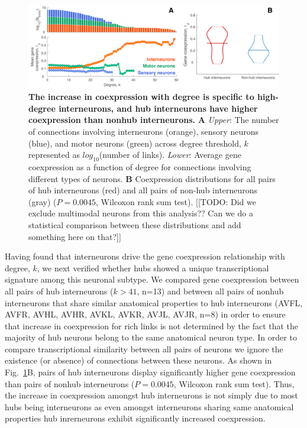 \documentclass[10pt,letterpaper]{article}
\begin{document}
\begin{figure}[h]
\centering
   \includegraphics[width=1\textwidth]{DegreeType.pdf}
 \caption{
\textbf{The increase in coexpression with degree is specific to high-degree interneurons, and hub interneurons have higher coexpression than nonhub interneurons.}
\textbf{A} \emph{Upper}: The number of connections involving interneurons (orange), sensory neurons (blue), and motor neurons (green) across degree threshold, $k$ represented as $log_{10}$(number of links).
\emph{Lower}: Average gene coexpression as a function of degree for connections involving different types of neurons.
\textbf{B} Coexpression distributions for all pairs of hub interneurons (red) and all pairs of non-hub interneurons (gray) ($P = 0.0045$, Wilcoxon rank sum test).
[[TODO: Did we exclude multimodal neurons from this analysis?? Can we do a statistical comparison between these distributions and add something here on that?]]
}
 \label{fig:interneuron_dep}
\end{figure}


Having found that interneurons drive the gene coexpression relationship with degree, $k$, we next verified whether hubs showed a unique transcriptional signature among this neuronal subtype.
We compared gene coexpression between all pairs of hub interneurons ($\textit{k}>41$, n=13) and between all pairs of nonhub interneurons that share similar anatomical properties to hub interneurons (AVFL, AVFR, AVHL, AVHR, AVKL, AVKR, AVJL, AVJR, n=8) in order to ensure that increase in coexpression for rich links is not determined by the fact that the majority of hub neurons belong to the same anatomical neuron type. 
In order to compare transcriptional similarity between all pairs of neurons we ignore the existence (or absence) of connections between these neurons.  
As shown in Fig.~\ref{fig:interneuron_dep}B, pairs of hub interneurons display significantly higher gene coexpression than pairs of nonhub interneurons ($P = 0.0045$, Wilcoxon rank sum test).
Thus, the increase in coexpression amongst hub interneurons is not simply due to most hubs being interneurons as even amongst interneurons sharing same anatomical properties hub inrerneurons exhibit significantly increased coexpression.
\end{document}

